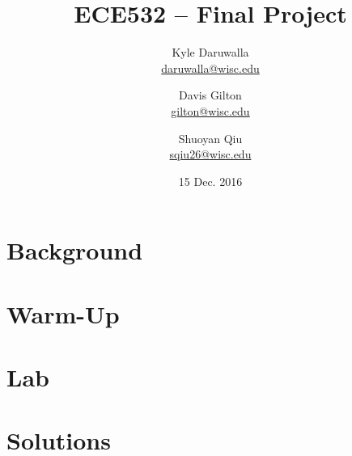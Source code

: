 \documentclass{report}
\title{ECE532 -- Final Project}
\author{Kyle Daruwalla \\ \href{mailto:daruwalla@wisc.edu}{daruwalla@wisc.edu}
    \and Davis Gilton \\ \href{mailto:gilton@wisc.edu}{gilton@wisc.edu}
    \and Shuoyan Qiu \\ \href{mailto:sqiu26@wisc.edu}{sqiu26@wisc.edu}
}
\date{15 Dec. 2016}
\renewcommand\appendix{\par
  \setcounter{section}{0}
  \setcounter{subsection}{0}
  \setcounter{figure}{0}
  \setcounter{table}{0}
  \renewcommand\thesection{Appendix \Alph{section}}
  \renewcommand\thefigure{\Alph{section}\arabic{figure}}
  \renewcommand\thetable{\Alph{section}\arabic{table}}
}
\begin{document}
\maketitle

\begin{abstract}
    
\end{abstract}

\section{Background}
\label{sec:background}


\section{Warm-Up}
\label{sec:warm-up}


\section{Lab}
\label{sec:lab}


\newpage
\nocite{*}


\newpage
\appendix
\section{Solutions}
\label{app:solutions}

\end{document}
